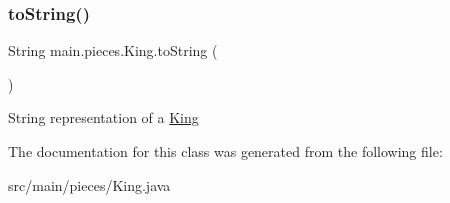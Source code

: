 \subsubsection{\texorpdfstring{to\+String()}{toString()}}
{\footnotesize\ttfamily String main.\+pieces.\+King.\+to\+String (\begin{DoxyParamCaption}{ }\end{DoxyParamCaption})}

String representation of a \hyperlink{classmain_1_1pieces_1_1_king}{King} 

The documentation for this class was generated from the following file\+:\begin{DoxyCompactItemize}
\item 
src/main/pieces/King.\+java\end{DoxyCompactItemize}
